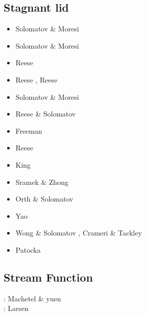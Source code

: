 \subsection{Stagnant lid} 

\begin{scriptsize}
\begin{itemize}
\item[\nineteenninetysix] Solomatov \& Moresi \cite{somo96}
\item[\nineteenninetyseven] Solomatov \& Moresi \cite{somo97}
\item[\nineteenninetyeight] Reese \etal \cite{resm98}
\item[\nineteenninetynine] Reese \etal \cite{resm99}, Reese \etal \cite{resb99}
\item[\twothousand] Solomatov \& Moresi \cite{somo00}
\item[\twothousandtwo] Reese \& Solomatov \cite{reso02}
\item[\twothousandfour] Freeman \etal \cite{frmm04}
\item[\twothousandfive] Reese \etal \cite{resb05}
\item[\twothousandnine] King \cite{king09}
\item[\twothousandten] Sramek \& Zhong \cite{srzh10}
\item[\twothousandeleven] Orth \& Solomatov \cite{orso11}
\item[\twothousandfourteen] Yao \etal \cite{yadl14}
\item[\twothousandsixteen] Wong \& Solomatov \cite{woso16b}, Crameri \& Tackley \cite{crta16}
\item[\twothousandseventeen] Patocka \etal \cite{pact17}
\end{itemize}
\end{scriptsize}

\subsection{Stream Function} 

\begin{scriptsize}
\noindent
\nineteeneightynine: Machetel \& yuen \cite{mayu89} \\
\nineteenninetysix: Larsen \etal \cite{laym96} \\
\end{scriptsize}

